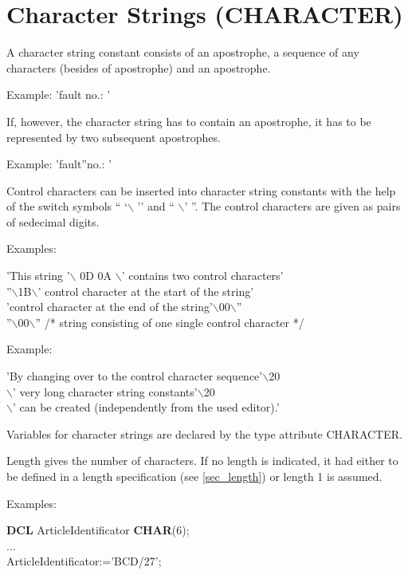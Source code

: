 \section{Character Strings (CHARACTER)}  %

A character string constant consists of an apostrophe, a sequence of any
characters (besides of apostrophe) and an apostrophe.

Example: 'fault no.: '

If, however, the character string has to contain an apostrophe, it has
to be represented by two subsequent apostrophes.

Example: 'fault''no.: '

Control characters can be inserted into character string constants with
the help of the switch symbols `` `$\backslash$ '' and `` $\backslash$'
''.  The control characters are given as pairs of sedecimal digits.

Examples:

'This string '$\backslash$ 0D 0A $\backslash$' contains two control characters'\\
''$\backslash$1B$\backslash$' control character at the start of the string'\\
'control character at the end of the string'$\backslash$00$\backslash$''\\
''$\backslash$00$\backslash$'' /* string consisting of one single control character */

Example:

'By changing over to the control character sequence'$\backslash$20\\
$\backslash$' very long character string constants'$\backslash$20\\
$\backslash$' can be created (independently from the used editor).'

Variables for character strings are declared by the type attribute
CHARACTER.



Length gives the number of characters. If no length is indicated, it had
either to be defined in a length specification (see \ref{sec_length}) or length 1 is
assumed.

Examples:

{\bf DCL} ArticleIdentificator {\bf CHAR}(6);\\
...\\
ArticleIdentificator:='BCD/27';

